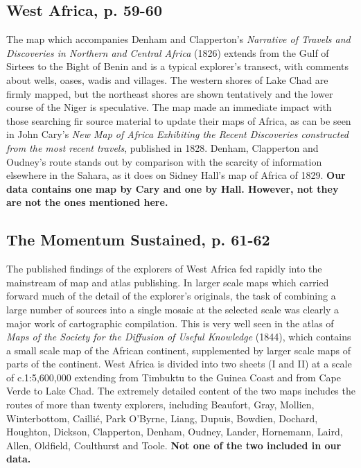 \documentclass[12pt]{article}
\begin{document}
\subsection{West Africa, p. 59-60}

The map which accompanies Denham and Clapperton's \textit{Narrative of Travels
and Discoveries in Northern and Central Africa} (1826) extends from the Gulf of
Sirtees to the Bight of Benin and is a typical explorer's transect, with
comments about wells, oases, wadis and villages. The western shores of Lake Chad
are firmly mapped, but the northeast shores are shown tentatively and the lower
course of the Niger is speculative. The map made an immediate impact with those
searching fir source material to update their maps of Africa, as can be seen in
John Cary's \textit{New Map of Africa Exhibiting the Recent Discoveries
constructed from the most recent travels}, published in 1828. Denham, Clapperton
and Oudney's route stands out by comparison with the scarcity of information
elsewhere in the Sahara, as it does on Sidney Hall's map of Africa of 1829.
\textbf{Our data contains one map by Cary and one by Hall. However, not they are
	not the ones mentioned here.}

\subsection{The Momentum Sustained, p. 61-62}
The published findings of the explorers of West Africa fed rapidly into the
mainstream of map and atlas publishing. In larger scale maps which carried
forward much of the detail of the explorer's originals, the task of combining a
large number of sources into a single mosaic at the selected scale was clearly a
major work of cartographic compilation. This is very well seen in the atlas of
\textit{Maps of the Society for the Diffusion of Useful Knowledge} (1844), which
contains a small scale map of the African continent, supplemented by larger
scale maps of parts of the continent. West Africa is divided into two sheets (I
and II) at a scale of c.1:5,600,000 extending from Timbuktu to the Guinea Coast
and from Cape Verde to Lake Chad. The extremely detailed content of the two maps
includes the routes of more than twenty explorers, including Beaufort, Gray,
Mollien, Winterbottom, Caillié, Park O'Byrne, Liang, Dupuis, Bowdien, Dochard,
Houghton, Dickson, Clapperton, Denham, Oudney, Lander, Hornemann, Laird, Allen,
Oldfield, Coulthurst and Toole. \textbf{Not one of the two included in our data.}
\end{document}
